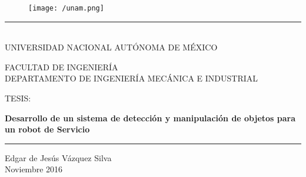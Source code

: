 \documentclass[a4paper, openright, 12pt]{report}
\begin{document}
\begin{titlepage}

	\begin{center}
		\vspace*{-1in}
		\begin{figure}[htb]
			\begin{center}
			\texttt{[image: /unam.png]}
			\end{center}
		\end{figure}
		\vspace*{0.35in}

		\begin{large}
			\rule{130mm}{0.1mm}\\
			UNIVERSIDAD NACIONAL AUTÓNOMA DE MÉXICO
		\end{large}
		\vspace*{0.55in}

		FACULTAD DE INGENIERÍA \\
		\vspace*{0.25in}
		DEPARTAMENTO DE INGENIERÍA MECÁNICA E INDUSTRIAL\\
		\vspace*{0.6in}
		\begin{large}
			TESIS:\\
		\end{large}
		\vspace*{0.2in}

		\begin{Large}
			\textbf{ Desarrollo de un sistema de detección y manipulación de objetos para un robot de Servicio} \\
		\end{Large}
		\vspace*{0.65in}

		\rule{110mm}{0.1mm}

		\vspace*{0.35in}
		\begin{large}
			Edgar de Jesús Vázquez Silva \\
			\vspace*{0.25in}
			Noviembre 2016\\
		\end{large}


	\end{center}

\end{titlepage}



\tableofcontents{}


\newpage{}













\newpage{}




\end{document}
